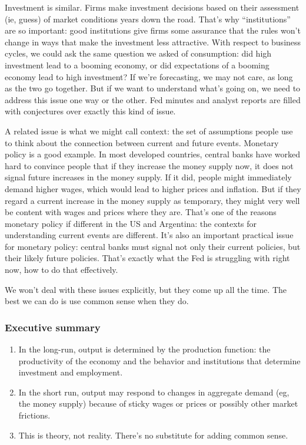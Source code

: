 \documentclass[letterpaper,12pt]{article}
\begin{document}
Investment is similar.  Firms make investment decisions
based on their assessment (ie, guess)
of market conditions years down the road.
That's why ``institutions'' are so important:
good institutions give firms some assurance that the rules won't change
in ways that make the investment less attractive.
With respect to business cycles, we could ask the same question
we asked of consumption:
did high investment lead to a booming economy,
or did expectations of a booming economy lead to high investment?
If we're forecasting, we may not care, as long as the two go
together.
But if we want to understand what's going on, we need to address
this issue one way or the other.
Fed minutes and analyst reports
are filled with conjectures over exactly this kind of issue.

A related issue is what we might call context:
the set of assumptions people use to think about
the connection between current and future events.
Monetary policy is a good example.
In most developed countries,
central banks have worked hard to convince people
that if they increase the money supply now,
it does not signal future increases in the money supply.
If it did, people might immediately demand higher wages,
which would lead to higher prices and inflation.
But if they regard a current increase in the money supply as temporary,
they might very well be content with wages and prices
where they are.
That's one of the reasons monetary policy if different
in the US and Argentina:
the contexts for understanding current events are different.
It's also an important practical issue for monetary policy:
central banks must signal not only their current policies, 
but their likely future policies.
That's exactly what the Fed is struggling with right now, 
how to do that effectively.  

We won't deal with these issues explicitly,
but they come up all the time.
The best we can do is use common sense when they do.


\subsubsection*{Executive summary}

\begin{enumerate}

\item In the long-run, output is determined by the production function:
the productivity of the economy and the behavior and institutions
that determine investment and employment.

\item In the short run, output may respond to changes in
aggregate demand (eg, the money supply) because of sticky wages or prices
or possibly other market frictions.

\item This is theory, not reality.
There's no substitute for adding common sense.
\end{enumerate}
\end{document}
